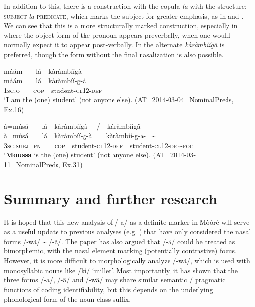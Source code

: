 \documentclass[output=paper]{langsci/langscibook}
\begin{document}
In addition to this, there is a construction with the copula \textit{la }with the structure: \textsc{subject} \textit{la }\textsc{predicate}, which marks the subject for greater emphasis, as in  and . We can see that this is a more structurally marked construction, especially in  where the object form of the pronoun appears preverbally, when one would normally expect it to appear post-verbally. In  the alternate \textit{k\`{a}ràmb\'{i}\'{i}g\~{a}} is preferred, though the form without the final nasalization is also possible. 

\ea\label{ex:teo:63}
\label{bkm:Ref264215052}máám\ \ \ \ lá\ \ kàràmb\'{i}ígà\\
\gll máám\ \ \ \ lá\ \ kàràmb\'{i}í\nobreakdash-g\nobreakdash-à\\
\textsc{1sg.o\ \ \ \ cop\ \ }student\nobreakdash-\textsc{cl12\nobreakdash-def}\\
\glt ‘\textbf{I} am the (one) student’ (not anyone else). (AT\_2014-03-04\_NominalPreds, Ex.16)
\z

\ea\label{ex:teo:64}
\label{bkm:Ref264215061}à=músá\ \ \ \ lá\ \ k\`{a}ràmb\'{i}\'{i}gà \ \ /\ \ k\`{a}ràmb\'{i}\'{i}g\~{a} \\
\gll à=músá\ \ \ \ lá\ \ k\`{a}ràmb\'{i}\'{i}\nobreakdash-g\nobreakdash-à\ \ \ \ k\`{a}ràmb\'{i}\'{i}\nobreakdash-g\nobreakdash-a- \ \~{ } \\
\textsc{3sg.subj=pn\ \ \ \ cop}\ \ student\nobreakdash-\textsc{cl12\nobreakdash-def}\ \ student\nobreakdash-\textsc{cl12\nobreakdash-def-foc}\\
\glt ‘\textbf{Mo}\textbf{ussa} is the (one) student’ (not anyone else). (AT\_2014-03-11\_NominalPreds, Ex.31)
\z

\section{Summary and further research}\label{sec:8}

It is hoped that this new analysis of /-a/ as a definite marker in Mòòré will serve as a useful update to previous analyses (e.g. \citealt{Peterson1971; Canu1973/1976}) that have only considered the nasal forms /-wã/ \~{} /-\~{a}/. The paper has also argued that /-\~{a}/ could be treated as bimorphemic, with the nasal element marking (potentially contrastive) focus. However, it is more difficult to morphologically analyze /-wã/, which is used with monosyllabic nouns like /kí/ ‘millet’. Most importantly, it has shown that the three forms /-a/, /\nobreakdash-\~{a}/ and /\nobreakdash-wã/ may share similar semantic / pragmatic functions of coding identifiability, but this depends on the underlying phonological form of the noun class suffix.
\end{document}
